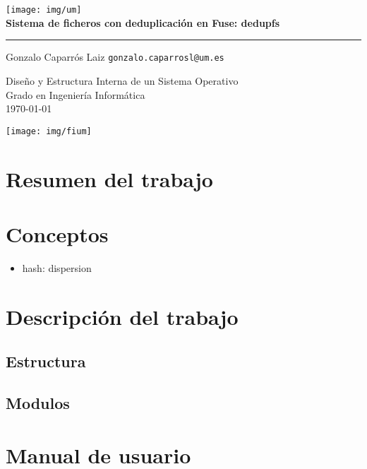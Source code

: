 \documentclass[a4paper,12pt]{article}
\begin{document}
\begin{titlepage}
\centering
\texttt{[image: img/um]}
\\
\vspace{2cm}
{\huge \textbf{Sistema de ficheros con deduplicación en Fuse: dedupfs}}
\\
\noindent\rule{10cm}{0.4pt}

Gonzalo Caparrós Laiz \texttt{gonzalo.caparrosl@um.es}

\vspace{2cm}

{\large Diseño y Estructura Interna de un Sistema Operativo}
\\
Grado en Ingeniería Informática
\vspace{1cm}
\\
\today


\vfill
\texttt{[image: img/fium]}

\end{titlepage}

\tableofcontents

\newpage
\section{Resumen del trabajo}

\bigskip


\section{Conceptos}

\begin{itemize}
\item hash: dispersion
\end{itemize}


\section{Descripción del trabajo}

\subsection{Estructura}
\subsection{Modulos}

\section{Manual de usuario}
\end{document}
